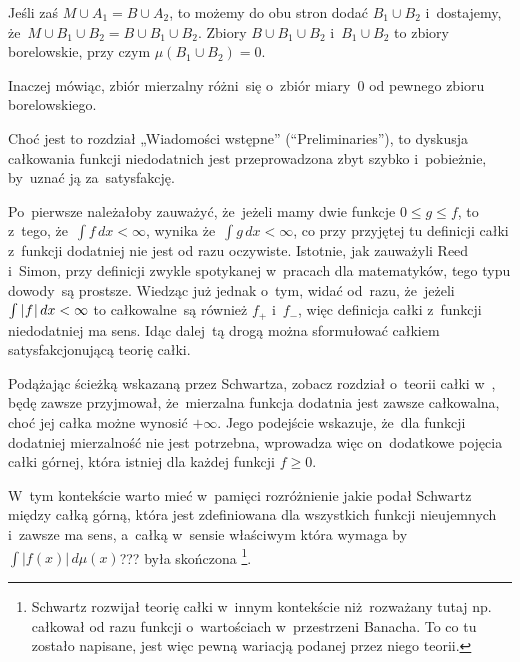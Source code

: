 \documentclass[a4paper,11pt]{article}
\begin{document}
Jeśli zaś $M \cup A_{ 1 } = B \cup A_{ 2 }$, to możemy do obu stron
dodać $B_{ 1 } \cup B_{ 2 }$ i~dostajemy,
że~$M \cup B_{ 1 } \cup B_{ 2 } = B \cup B_{ 1 } \cup B_{ 2 }$. Zbiory
$B \cup B_{ 1 } \cup B_{ 2 }$ i~$B_{ 1 } \cup B_{ 2 }$ to zbiory
borelowskie, przy czym $\mu( B_{ 1 } \cup B_{ 2 } ) = 0$.

Inaczej mówiąc, zbiór mierzalny różni~się o~zbiór miary~0 od pewnego
zbioru borelowskiego. %

\vspace{\spaceFour}



\start {} Choć jest to rozdział „Wiadomości wstępne”
(``Preliminaries''), to dyskusja całkowania funkcji niedodatnich jest
przeprowadzona zbyt szybko i~pobieżnie, by~uznać ją za~satysfakcję.

Po~pierwsze należałoby zauważyć, że~jeżeli mamy dwie funkcje
$0 \leq g \leq f$, to z~tego, że~$\int f \, dx < \infty$, wynika
że~$\int g \, dx < \infty$, co przy przyjętej tu definicji całki
z~funkcji dodatniej nie jest od razu oczywiste. Istotnie, jak
zauważyli Reed i~Simon, przy definicji zwykle spotykanej w~pracach dla
matematyków, tego typu dowody~są prostsze. Wiedząc już jednak o~tym,
widać od~razu, że~jeżeli $\int | \hspace{0.05em}  f  \hspace{0.05em} | \, dx < \infty$ to
całkowalne~są również $f_{ + }$ i~$f_{ - }$, więc definicja całki
z~funkcji niedodatniej ma sens. Idąc dalej~tą drogą można sformułować
całkiem satysfakcjonującą teorię całki.

Podążając ścieżką wskazaną przez Schwartza, zobacz rozdział o~teorii
całki w~\cite{SchwartzKursAnalizyMatematycznejVolI1979}, będę zawsze
przyjmował, że~mierzalna funkcja dodatnia jest zawsze całkowalna, choć
jej całka możne wynosić $+\infty$. Jego podejście wskazuje, że~dla
funkcji dodatniej mierzalność nie jest potrzebna, wprowadza więc
on~dodatkowe pojęcia całki górnej, która istniej dla każdej funkcji
$f \geq 0$. %

W~tym kontekście warto mieć w~pamięci rozróżnienie jakie podał
Schwartz między całką górną, która jest zdefiniowana dla wszystkich
funkcji nieujemnych i~zawsze ma sens, a~całką w~sensie właściwym
która wymaga by~$\int | f( x ) | \, d\mu( x )$??? była skończona
\cite{SchwartzKursAnalizyMatematycznejVolI1979}\footnote{Schwartz rozwijał teorię całki w~innym
kontekście niż~rozważany tutaj np. całkował od razu funkcji
o~wartościach w~przestrzeni Banacha. To co tu zostało napisane, jest
więc pewną wariacją podanej przez niego teorii.}.

\vspace{\spaceFour}
\end{document}
